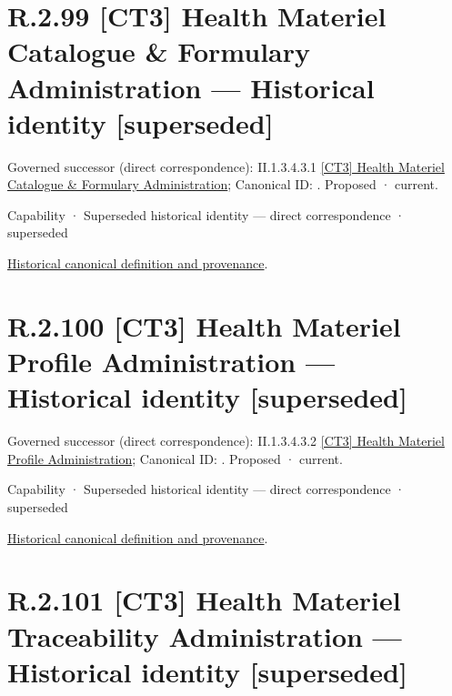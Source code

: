\section*{R.2.99 [CT3] Health Materiel Catalogue \& Formulary Administration — Historical identity [superseded]}
\label{navigation:R.2.99}

{\small Governed successor (direct correspondence): II.1.3.4.3.1 \hyperref[element:28b327760af94b8b986357469524d793]{[CT3] Health Materiel Catalogue \& Formulary Administration}; Canonical ID: \texttt{}. Proposed · current.}\par
\label{element:5c691959e2cc4a289fc25b9f3497eed9}
{\small Capability · Superseded historical identity — direct correspondence · superseded}\par
\href{../../../../../../../continuum/strategy/capability/5c691959e2cc4a289fc25b9f3497eed9.md}{Historical canonical definition and provenance}.\par
\section*{R.2.100 [CT3] Health Materiel Profile Administration — Historical identity [superseded]}
\label{navigation:R.2.100}

{\small Governed successor (direct correspondence): II.1.3.4.3.2 \hyperref[element:9626edae517d40d2bfae619860f18e20]{[CT3] Health Materiel Profile Administration}; Canonical ID: \texttt{}. Proposed · current.}\par
\label{element:9216f9cc905e4526b1d98cd4ab382cbf}
{\small Capability · Superseded historical identity — direct correspondence · superseded}\par
\href{../../../../../../../continuum/strategy/capability/9216f9cc905e4526b1d98cd4ab382cbf.md}{Historical canonical definition and provenance}.\par
\section*{R.2.101 [CT3] Health Materiel Traceability Administration — Historical identity [superseded]}
\label{navigation:R.2.101}

